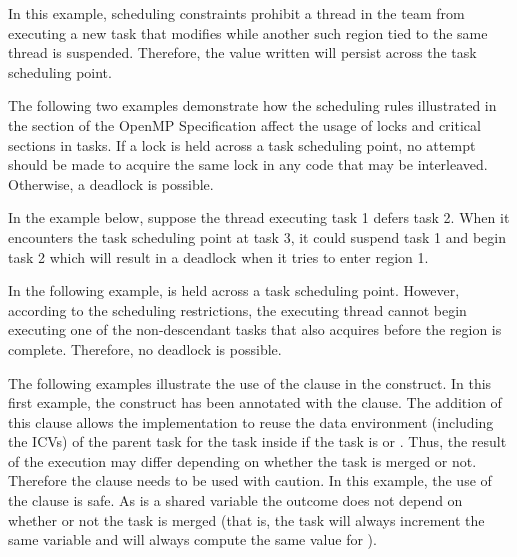 

In this example, scheduling constraints prohibit a thread in the team from executing 
a new task that modifies  while another such  region tied to the 
same thread is suspended. Therefore, the value written will persist across the 
task scheduling point.



The following two examples demonstrate how the scheduling rules illustrated in 
the  section of the OpenMP Specification affect the usage of locks
and critical sections in tasks.  If a lock is held 
across a task scheduling point, no attempt should be made to acquire the same lock 
in any code that may be interleaved.  Otherwise, a deadlock is possible.

In the example below, suppose the thread executing task 1 defers task 2.  When 
it encounters the task scheduling point at task 3, it could suspend task 1 and 
begin task 2 which will result in a deadlock when it tries to enter  region 
1.



In the following example,  is held across a task scheduling point. 
 However, according to the scheduling restrictions, the executing thread cannot
begin executing one of the non-descendant tasks that also acquires  before 
the  region is complete.  Therefore, no deadlock is possible.


\clearpage

The following examples illustrate the use of the  clause in the 
 construct. In this first example, the  construct has 
been annotated with the   clause. The addition of this clause 
allows the implementation to reuse the data environment (including the ICVs) of 
the parent task for the task inside  if the task is 
or .
Thus, the result of the execution may differ depending on whether the task is merged 
or not. Therefore the  clause needs to be used with caution. In this example,
the use of the  clause is safe. As  is a shared variable the
outcome does not depend on whether or not the task is merged (that is, the task 
will always increment the same variable and will always compute the same value 
for ).

